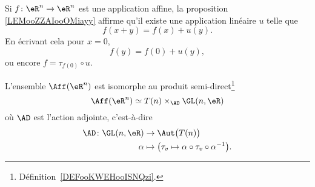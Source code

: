 Si \( f\colon \eR^n\to \eR^n\) est une application affine, la proposition \ref{LEMooZZAIooOMiayy} affirme qu'il existe une application linéaire \( u\) telle que
\begin{equation}
    f(x+y)=f(x)+u(y).
\end{equation}
En écrivant cela pour \( x=0\),
\begin{equation}
    f(y)=f(0)+u(y),
\end{equation}
ou encore \( f=\tau_{f(0)}\circ u\).

\begin{proposition}  \label{PROPooTPFZooKtFxhg}
    L'ensemble \( \Aff(\eR^n)\) est isomorphe au produit semi-direct\footnote{Définition~\ref{DEFooKWEHooISNQzi}.}
    \begin{equation}
        \Aff(\eR^n)\simeq  T(n)\times_{\AD}\GL(n,\eR)
    \end{equation}
    où \( \AD\) est l'action adjointe, c'est-à-dire
    \begin{equation}
        \begin{aligned}
            \AD\colon \GL(n,\eR)&\to \Aut\big( T(n) \big) \\
            \alpha&\mapsto\big( \tau_v\mapsto \alpha\circ\tau_v\circ\alpha^{-1}\big).
        \end{aligned}
    \end{equation}
\end{proposition}

